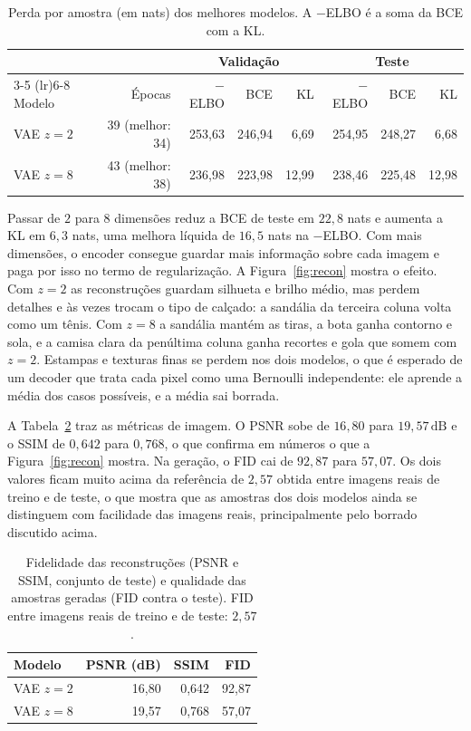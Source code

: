 \documentclass[11pt,a4paper]{article}
\begin{document}
\begin{table}[H]
\centering
\caption{Perda por amostra (em nats) dos melhores modelos. A $-$ELBO é a soma da BCE com a KL.}
\label{tab:loss}
\small
\begin{tabular}{lrrrrrrr}
\toprule
 & & \multicolumn{3}{c}{Validação} & \multicolumn{3}{c}{Teste} \\
\cmidrule(lr){3-5} \cmidrule(lr){6-8}
Modelo & Épocas & $-$ELBO & BCE & KL & $-$ELBO & BCE & KL \\
\midrule
VAE $z = 2$ & 39 (melhor: 34) & 253,63 & 246,94 & 6,69  & 254,95 & 248,27 & 6,68 \\
VAE $z = 8$ & 43 (melhor: 38) & 236,98 & 223,98 & 12,99 & 238,46 & 225,48 & 12,98 \\
\bottomrule
\end{tabular}
\end{table}

Passar de $2$ para $8$ dimensões reduz a BCE de teste em $22{,}8$ nats e aumenta a KL em $6{,}3$ nats, uma melhora líquida de $16{,}5$ nats na $-$ELBO. Com mais dimensões, o encoder consegue guardar mais informação sobre cada imagem e paga por isso no termo de regularização. A Figura~\ref{fig:recon} mostra o efeito. Com $z = 2$ as reconstruções guardam silhueta e brilho médio, mas perdem detalhes e às vezes trocam o tipo de calçado: a sandália da terceira coluna volta como um tênis. Com $z = 8$ a sandália mantém as tiras, a bota ganha contorno e sola, e a camisa clara da penúltima coluna ganha recortes e gola que somem com $z = 2$. Estampas e texturas finas se perdem nos dois modelos, o que é esperado de um decoder que trata cada pixel como uma Bernoulli independente: ele aprende a média dos casos possíveis, e a média sai borrada.

A Tabela~\ref{tab:fid} traz as métricas de imagem. O PSNR sobe de $16{,}80$ para $19{,}57\,\mathrm{dB}$ e o SSIM de $0{,}642$ para $0{,}768$, o que confirma em números o que a Figura~\ref{fig:recon} mostra. Na geração, o FID cai de $92{,}87$ para $57{,}07$. Os dois valores ficam muito acima da referência de $2{,}57$ obtida entre imagens reais de treino e de teste, o que mostra que as amostras dos dois modelos ainda se distinguem com facilidade das imagens reais, principalmente pelo borrado discutido acima.

\begin{table}[H]
\centering
\caption{Fidelidade das reconstruções (PSNR e SSIM, conjunto de teste) e qualidade das amostras geradas (FID contra o teste). FID entre imagens reais de treino e de teste: $2{,}57$.}
\label{tab:fid}
\small
\begin{tabular}{lrrr}
\toprule
Modelo & PSNR (dB) & SSIM & FID \\
\midrule
VAE $z = 2$ & 16,80 & 0,642 & 92,87 \\
VAE $z = 8$ & 19,57 & 0,768 & 57,07 \\
\bottomrule
\end{tabular}
\end{table}
\end{document}

